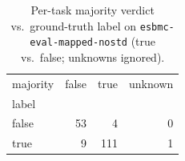 \begin{table}[t]
  \centering
  \caption{Per-task majority verdict vs.\ ground-truth label on \texttt{esbmc-eval-mapped-nostd} (true vs.\ false; unknowns ignored).}
  \label{tab:majority-esbmc-eval-mapped-nostd}
\begin{tabular}{lrrr}
\toprule
majority & false & true & unknown \\
label &  &  &  \\
\midrule
false & 53 & 4 & 0 \\
true & 9 & 111 & 1 \\
\bottomrule
\end{tabular}
\end{table}
